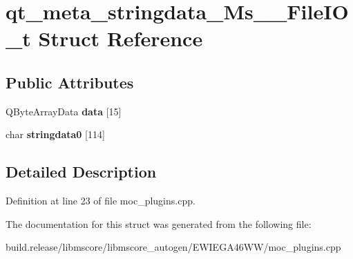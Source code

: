 \hypertarget{structqt__meta__stringdata___ms_____file_i_o__t}{}\section{qt\+\_\+meta\+\_\+stringdata\+\_\+\+Ms\+\_\+\+\_\+\+File\+I\+O\+\_\+t Struct Reference}
\label{structqt__meta__stringdata___ms_____file_i_o__t}
\subsection*{Public Attributes}
\begin{DoxyCompactItemize}
\item 
\mbox{\label{structqt__meta__stringdata___ms_____file_i_o__t_a4fe55ca4d0ac1f8f1767a8d5664d1f35}} 
Q\+Byte\+Array\+Data {\bfseries data} \mbox{[}15\mbox{]}
\item 
\mbox{\label{structqt__meta__stringdata___ms_____file_i_o__t_a1395e43c5d8418f1af6970da87731d83}} 
char {\bfseries stringdata0} \mbox{[}114\mbox{]}
\end{DoxyCompactItemize}


\subsection{Detailed Description}


Definition at line 23 of file moc\+\_\+plugins.\+cpp.



The documentation for this struct was generated from the following file\+:\begin{DoxyCompactItemize}
\item 
build.\+release/libmscore/libmscore\+\_\+autogen/\+E\+W\+I\+E\+G\+A46\+W\+W/moc\+\_\+plugins.\+cpp\end{DoxyCompactItemize}
